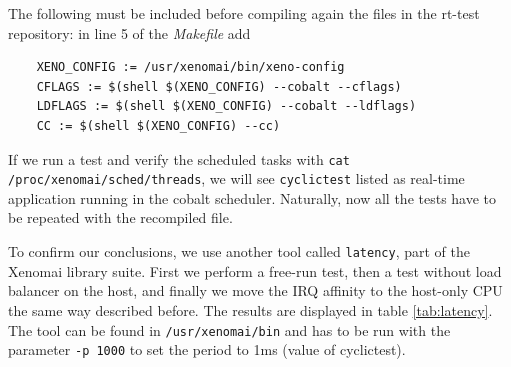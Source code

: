 \documentclass[]{scrartcl}
\begin{document}
The following must be included before compiling again the files in the rt-test repository: in line 5 of the \textit{Makefile} add

\begin{verbatim}
	XENO_CONFIG := /usr/xenomai/bin/xeno-config
	CFLAGS := $(shell $(XENO_CONFIG) --cobalt --cflags)
	LDFLAGS := $(shell $(XENO_CONFIG) --cobalt --ldflags)
	CC := $(shell $(XENO_CONFIG) --cc)
\end{verbatim}

If we run a test and verify the scheduled tasks with \texttt{cat /proc/xenomai/sched/threads}, we will see \texttt{cyclictest} listed as real-time application running in the cobalt scheduler.
Naturally, now all the tests have to be repeated with the recompiled file.


To confirm our conclusions, we use another tool called \texttt{latency}, part of the Xenomai library suite. First we perform a free-run test, then a test without load balancer on the host, and finally we move the IRQ affinity to the host-only CPU the same way described before. 
The results are displayed in table \ref{tab:latency}. The tool can be found in \texttt{/usr/xenomai/bin} and has to be run with the parameter \texttt{-p 1000} to set the period to 1ms (value of cyclictest).
\end{document}
